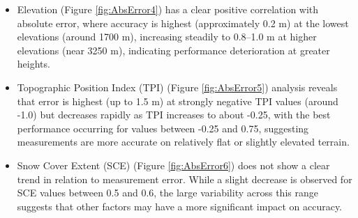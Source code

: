 \documentclass[preprint,12pt]{elsarticle}
\begin{document}
{\begin{itemize}
     \item Elevation (Figure \ref{fig:AbsError4}) has a clear positive correlation with absolute error, where accuracy is highest (approximately 0.2 m) at the lowest elevations (around 1700 m), increasing steadily to 0.8--1.0 m at higher elevations (near 3250 m), indicating performance deterioration at greater heights. %
     
     \item Topographic Position Index (TPI) (Figure \ref{fig:AbsError5}) analysis reveals that error is highest (up to 1.5 m) at strongly negative TPI values (around -1.0) but decreases rapidly as TPI increases to about -0.25, with the best performance occurring for values between -0.25 and 0.75, suggesting measurements are more accurate on relatively flat or slightly elevated terrain. %
     
     \item Snow Cover Extent (SCE) (Figure \ref{fig:AbsError6}) does not show a clear trend in relation to measurement error. While a slight decrease is observed for SCE values between 0.5 and 0.6, the large variability across this range suggests that other factors may have a more significant impact on accuracy. %
     

\end{itemize}}
\end{document}
